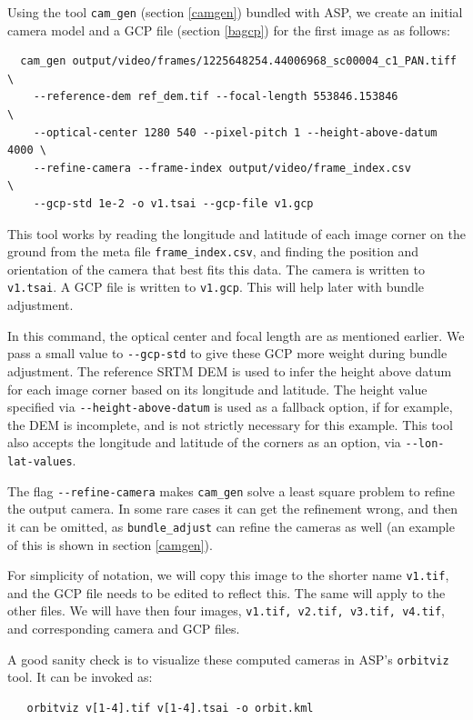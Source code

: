 Using the tool \texttt{cam\_gen} (section \ref{camgen}) 
bundled with ASP, we create an initial camera model and a GCP file (section \ref{bagcp})
for the first image as as follows:

\begin{verbatim}
  cam_gen output/video/frames/1225648254.44006968_sc00004_c1_PAN.tiff   \
    --reference-dem ref_dem.tif --focal-length 553846.153846            \
    --optical-center 1280 540 --pixel-pitch 1 --height-above-datum 4000 \
    --refine-camera --frame-index output/video/frame_index.csv          \
    --gcp-std 1e-2 -o v1.tsai --gcp-file v1.gcp
\end{verbatim}

This tool works by reading the longitude and latitude of each image corner on the ground 
from the meta file \texttt{frame\_index.csv}, and finding the position and orientation
of the camera that best fits this data. The camera is written to \texttt{v1.tsai}. 
A GCP file is written to \texttt{v1.gcp}. This will help later with bundle adjustment.

In this command, the optical center and focal length are as mentioned earlier. We 
pass a small value to \texttt{-\/-gcp-std} to give these GCP more weight during
bundle adjustment. The reference SRTM DEM is used to infer the height above datum for
each image corner based on its longitude and latitude. The height value specified
via \texttt{-\/-height-above-datum} is used as a fallback option, if for example,
the DEM is incomplete, and is not strictly necessary for this example. 
This tool also accepts the longitude and latitude of the corners as an option,
via \texttt{-\/-lon-lat-values}.

The flag \texttt{-\/-refine-camera} makes \texttt{cam\_gen} solve a least
square problem to refine the output camera. In some rare cases it can get the
refinement wrong, and then it can be omitted, as \texttt{bundle\_adjust}
can refine the cameras as well (an example of this is shown in section \ref{camgen}).

For simplicity of notation, we will copy this image to the shorter name
\texttt{v1.tif}, and the GCP file needs to be edited to reflect
this. The same will apply to the other files. We will have then four
images, \texttt{v1.tif, v2.tif, v3.tif, v4.tif}, and corresponding
camera and GCP files.

A good sanity check is to visualize these computed cameras in ASP's
\texttt{orbitviz} tool. It can be invoked as:
\begin{verbatim}
   orbitviz v[1-4].tif v[1-4].tsai -o orbit.kml
\end{verbatim}

